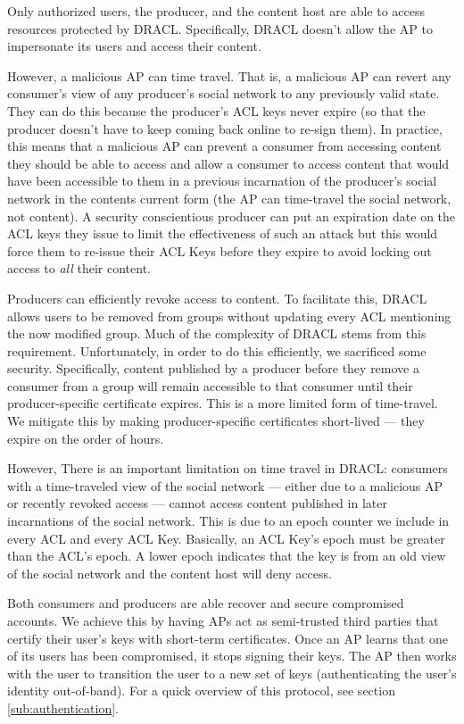 \documentclass[pdftex,12pt,a4papaer,twoside,notitlepage]{report}
\begin{document}
Only authorized users, the producer, and the content host are able to access
resources protected by DRACL\@. Specifically, DRACL doesn't allow the AP to
impersonate its users and access their content.

However, a malicious AP can time travel. That is, a malicious AP can revert any
consumer's view of any producer's social network to any previously valid state.
They can do this because the producer's ACL keys never expire (so that the
producer doesn't have to keep coming back online to re-sign them). In practice,
this means that a malicious AP can prevent a consumer from accessing content
they should be able to access and allow a consumer to access content that would
have been accessible to them in a previous incarnation of the producer's social
network in the contents current form (the AP can time-travel the social network,
not content). A security conscientious producer can put an expiration date on
the ACL keys they issue to limit the effectiveness of such an attack but this
would force them to re-issue their ACL Keys before they expire to avoid locking
out access to \emph{all} their content.

Producers can efficiently revoke access to content. To facilitate this, DRACL
allows users to be removed from groups without updating every ACL mentioning the
now modified group. Much of the complexity of DRACL stems from this requirement.
Unfortunately, in order to do this efficiently, we sacrificed some security.
Specifically, content published by a producer before they remove a consumer from
a group will remain accessible to that consumer until their producer-specific
certificate expires. This is a more limited form of time-travel. We mitigate
this by making producer-specific certificates short-lived --- they expire on the
order of hours.

However, There is an important limitation on time travel in DRACL: consumers with a
time-traveled view of the social network --- either due to a malicious AP or
recently revoked access --- cannot access content published in later
incarnations of the social network. This is due to an epoch counter we include
in every ACL and every ACL Key. Basically, an ACL Key's epoch must be greater
than the ACL's epoch. A lower epoch indicates that the key is from an old view
of the social network and the content host will deny access.

Both consumers and producers are able recover and secure compromised accounts.
We achieve this by having APs act as semi-trusted third parties that certify
their user's keys with short-term certificates. Once an AP learns that one of
its users has been compromised, it stops signing their keys. The AP then works
with the user to transition the user to a new set of keys (authenticating the
user's identity out-of-band). For a quick overview of this protocol, see section
\ref{sub:authentication}.
\end{document}

